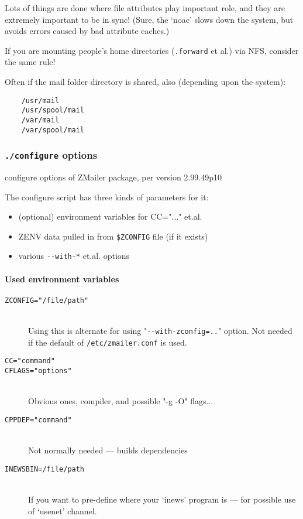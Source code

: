 Lots of things are done where file attributes play important
role, and they are extremely important to be in sync!
(Sure, the `noac' slows down the system, but avoids errors
caused by bad attribute caches.)

If you are mounting people's home directories ({\tt .forward} et al.)
via NFS, consider the same rule!

Often if the mail folder directory is shared, also (depending upon the system):
\begin{verbatim}
    /usr/mail
    /usr/spool/mail
    /var/mail
    /var/spool/mail
\end{verbatim}


\subsubsection{{\tt ./configure} options}%
%
%
\label{configure_options_list}

configure  options of ZMailer package, per version 2.99.49p10


The  configure  script has three kinds of parameters for it:
\begin{itemize}
\item (optional) environment variables for CC="..." et.al.
\item ZENV data pulled in from {\tt \$ZCONFIG} file (if it exists)
\item various  \verb/--with-*/  et.al. options
\end{itemize}


\paragraph{Used environment variables}

\begin{description}
\item[\tt ZCONFIG="/file/path"] \mbox{} \\
Using this is alternate for using "\verb/--with-zconfig=../" option.
Not needed if the default of {\tt /etc/zmailer.conf} is used.

\item[\tt CC="command"]
\item[\tt CFLAGS="options"] \mbox{} \\
Obvious ones, compiler, and possible "-g -O" flags...

\item[\tt CPPDEP="command"] \mbox{} \\
Not normally needed --- builds dependencies

\item[\tt INEWSBIN=/file/path] \mbox{} \\
If you want to pre-define where your `inews' program
is --- for possible use of `usenet' channel.
\end{description}

